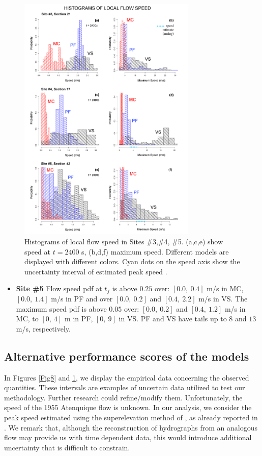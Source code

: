 \documentclass[nhess, manuscript]{copernicus}
\begin{document}
\begin{figure}[H]
\centering
\includegraphics[width=0.76\textwidth]{Fig9.png}
\caption{Histograms of local flow speed in Sites \#3,\#4, \#5. (a,c,e) show speed at $t=2400$ s, (b,d,f) maximum speed. Different models are displayed with different colors. Cyan dots on the speed axis show the uncertainty interval of estimated peak speed \cite{Pierson1985}.}
\label{Fig9}
\end{figure}

\begin{itemize}
\item\textbf{Site \#5} Flow speed pdf at $t_f$ is above $0.25$ over: $[0.0,\ 0.4]$ m/s in MC, $[0.0,\ 1.4]$ m/s in PF and over $[0.0,\ 0.2]$ and $[0.4,\ 2.2]$  m/s in VS. The maximum speed pdf is above $0.05$ over: $[0.0,\ 0.2]$ and $[0.4,\ 1.2]$ m/s in MC, to $[0,\ 4]$ m in PF, $[0,\ 9]$ in VS. PF and VS have tails up to $8$ and $13$ m/s, respectively.
\end{itemize}

\subsection{Alternative performance scores of the models}
In  Figures \ref{Fig8} and \ref{Fig9}, we display the empirical data concerning the observed quantities. These intervals are examples of uncertain data utilized to test our methodology. Further research could refine/modify them. Unfortunately, the speed of the 1955 Atenquique flow is unknown. In our analysis, we consider the peak speed estimated using the superelevation method of \cite{Pierson1985}, as already reported in \cite{Saucedo2008}. We remark that, although the reconstruction of hydrographs from an analogous flow may provide us with time dependent data, this would introduce additional uncertainty that is difficult to constrain.
\end{document}
